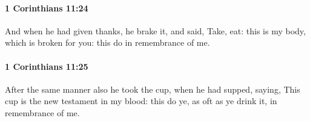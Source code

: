 		\paragraph{1 Corinthians 11:24} %
			\label{1CORINTHIANS-11-24}

			And when he had given thanks, he brake it, and said, Take, eat: this is my body, which is broken for you: this do in remembrance of me.

			\begin{framed}
				\scriptsize
				\begin{compactdesc}
					\item[SBLG] 
				\end{compactdesc}
			\end{framed}

		\paragraph{1 Corinthians 11:25} %
			\label{1CORINTHIANS-11-25}

			After the same manner also he took the cup, when he had supped, saying, This cup is the new testament in my blood: this do ye, as oft as ye drink it, in remembrance of me.

